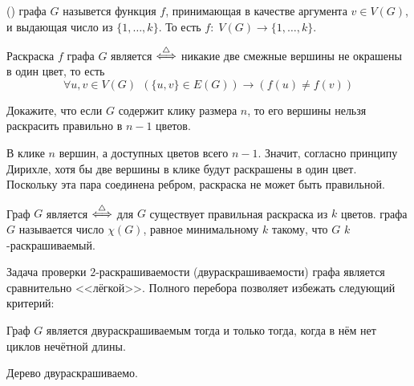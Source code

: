 \begin{definition}
     () графа $ G $ назывется функция $ f $,
    принимающая в качестве аргумента $ v \in V(G) $, и выдающая число из $ \{ 1, \ldots, k \} $.
    То есть $ f: \; V(G) \to \{1, \ldots, k \} $.
\end{definition}

\begin{definition}
    Раскраска $ f $ графа $ G $ является  $ \overset{\triangle}{\Longleftrightarrow} $ никакие две смежные вершины не окрашены в один цвет, то есть
    \[
        \forall u, v \in V(G) \;\, \left( \{u, v\} \in E(G) \right) \rightarrow \left( f(u) \neq f(v) \right)
    \]
\end{definition}

\begin{Exercise}[counter=SecExercise, label={exercise:graphs:clique_max_colors}]
    \noindent
    Докажите, что если $ G $ содержит клику размера $ n $,
    то его вершины нельзя раскрасить правильно в $ n - 1 $ цветов.
\end{Exercise}

\begin{Answer}
    \noindent
    В клике $ n $ вершин, а доступных цветов всего $ n - 1 $.
    Значит, согласно принципу Дирихле, хотя бы две вершины в клике будут раскрашены в один цвет.
    Поскольку эта пара соединена ребром, раскраска не может быть правильной.
\end{Answer}

\begin{definition}
    Граф $ G $ является  $ \overset{\triangle}{\Longleftrightarrow} $ для $ G $ существует правильная раскраска из $ k $ цветов.
     графа $ G $ называется число $ \chi(G) $, равное минимальному $ k $ такому, что $ G $ $ k $-раскрашиваемый.
\end{definition}

Задача проверки $ 2 $-раскрашиваемости (двураскрашиваемости) графа является сравнительно <<лёгкой>>.
Полного перебора позволяет избежать следующий критерий:
\begin{theorem}
    \label{theorem:graphs:2_coloring_criterion}
    Граф $ G $ является двураскрашиваемым тогда и только тогда, когда в нём нет циклов нечётной длины.
\end{theorem}

\begin{corollary}
    \label{corollary:graphs:tree_2_coloring}
    Дерево двураскрашиваемо.
\end{corollary}

